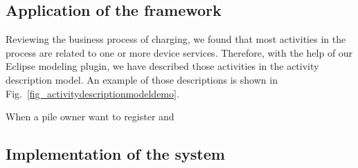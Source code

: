 \subsection{Application of the framework}
Reviewing the business process of charging, we found that most activities in the process are related to one or more device services. Therefore, with the help of our Eclipse modeling plugin, we have described those activities in the activity description model. An example of those descriptions is shown in Fig.~\ref{fig_activitydescriptionmodeldemo}. 

When a pile owner want to register and 



\subsection{Implementation of the system}